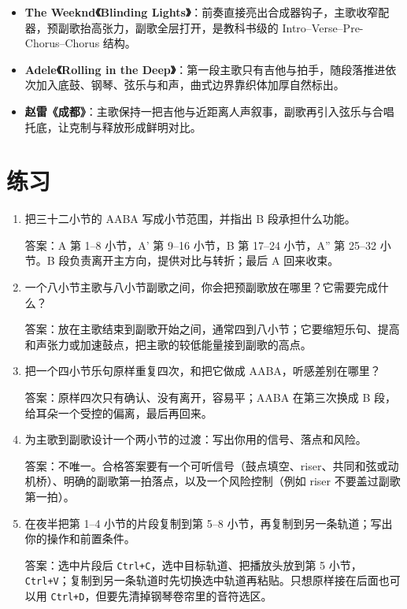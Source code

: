 \begin{itemize}
  \item \textbf{The Weeknd《Blinding Lights》}：前奏直接亮出合成器钩子，主歌收窄配器，预副歌抬高张力，副歌全层打开，是教科书级的 Intro--Verse--Pre-Chorus--Chorus 结构。
  \item \textbf{Adele《Rolling in the Deep》}：第一段主歌只有吉他与拍手，随段落推进依次加入底鼓、钢琴、弦乐与和声，曲式边界靠织体加厚自然标出。
  \item \textbf{赵雷《成都》}：主歌保持一把吉他与近距离人声叙事，副歌再引入弦乐与合唱托底，让克制与释放形成鲜明对比。
\end{itemize}

\section{练习}


\begin{exercise}
\begin{enumerate}
  \item 把三十二小节的 AABA 写成小节范围，并指出 B 段承担什么功能。
  \par\noindent 答案：A 第 1--8 小节，A' 第 9--16 小节，B 第 17--24 小节，A'' 第 25--32 小节。B 段负责离开主方向，提供对比与转折；最后 A 回来收束。
  \item 一个八小节主歌与八小节副歌之间，你会把预副歌放在哪里？它需要完成什么？
  \par\noindent 答案：放在主歌结束到副歌开始之间，通常四到八小节；它要缩短乐句、提高和声张力或加速鼓点，把主歌的较低能量接到副歌的高点。
  \item 把一个四小节乐句原样重复四次，和把它做成 AABA，听感差别在哪里？
  \par\noindent 答案：原样四次只有确认、没有离开，容易平；AABA 在第三次换成 B 段，给耳朵一个受控的偏离，最后再回来。
  \item 为主歌到副歌设计一个两小节的过渡：写出你用的信号、落点和风险。
  \par\noindent 答案：不唯一。合格答案要有一个可听信号（鼓点填空、riser、共同和弦或动机桥）、明确的副歌第一拍落点，以及一个风险控制（例如 riser 不要盖过副歌第一拍）。
  \item 在夜半把第 1--4 小节的片段复制到第 5--8 小节，再复制到另一条轨道；写出你的操作和前置条件。
  \par\noindent 答案：选中片段后 \texttt{Ctrl+C}，选中目标轨道、把播放头放到第 5 小节，\texttt{Ctrl+V}；复制到另一条轨道时先切换选中轨道再粘贴。只想原样接在后面也可以用 \texttt{Ctrl+D}，但要先清掉钢琴卷帘里的音符选区。
\end{enumerate}
\end{exercise}

